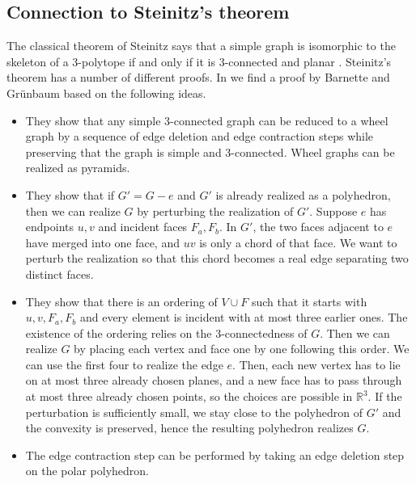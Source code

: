 \documentclass[10pt,a4paper]{article}
\newcommand{\R}[0]{\mathbb{R}}
\begin{document}
\subsection{Connection to Steinitz's theorem}\label{subs:steinitz}

The classical theorem of Steinitz says that a simple graph is isomorphic to the skeleton of a 3-polytope if and only if it is 3-connected and planar \cite{Steinitz1922}. Steinitz's theorem has a number of different proofs. In \cite{BarnetteGruenbaum1969Steinitz} we find a proof by Barnette and Grünbaum based on the following ideas.
\begin{itemize}
    \item They show that any simple 3-connected graph can be reduced to a wheel graph by a sequence of edge deletion and edge contraction steps while preserving that the graph is simple and 3-connected. Wheel graphs can be realized as pyramids.
    \item They show that if $G'=G-e$ and $G'$ is already realized as a polyhedron, then we can realize $G$ by perturbing the realization of $G'$.  Suppose $e$ has endpoints $u,v$ and incident faces $F_a,F_b$.  In $G'$, the two faces adjacent to $e$ have merged into one face, and $uv$ is only a chord of that face. We want to perturb the realization so that this chord becomes a real edge separating two distinct faces.
    \item They show that there is an ordering of $V\cup F$ such that it starts with $u,v,F_a,F_b$ and every element is incident with at most three earlier ones. The existence of the ordering relies on the 3-connectedness of $G$. Then we can realize $G$ by placing each vertex and face one by one following this order. We can use the first four to realize the edge $e$. Then, each new vertex has to lie on at most three already chosen planes, and a new face has to pass through at most three already chosen points, so the choices are possible in $\R^3$. If the perturbation is sufficiently small, we stay close to the polyhedron of $G'$ and the convexity is preserved, hence the resulting polyhedron realizes $G$. 
    \item The edge contraction step can be performed by taking an edge deletion step on the polar polyhedron. 
\end{itemize}
\end{document}
